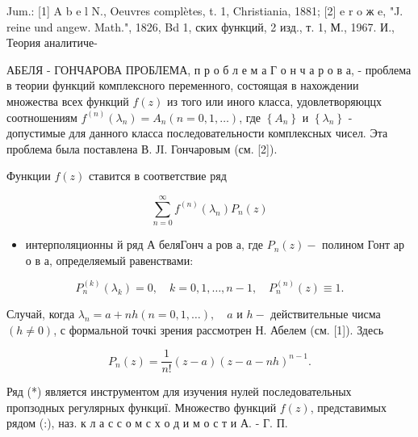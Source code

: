 \documentclass[10pt]{article}
\begin{document}
Jum.: [1] A b e l N., Oeuvres complètes, t. 1, Christiania, 1881; [2] e r o ж e, "J. reine und angew. Math.", 1826, Bd 1, ских функций, 2 изд., т. 1, М., 1967. И., Теория аналитиче-



АБЕЛЯ - ГОНЧАРОВА ПРОБЛЕМА, п р о б л е м а Г о н ч а р о в а, - проблема в теории функций комплексного переменного, состоящая в нахождении множества всех функций $f(z)$ из того или иного класса, удовлетворяюццх соотношениям $f^{(n)}\left(\lambda_{n}\right)=A_{n}(n=0,1, \ldots)$, где $\left\{A_{n}\right\}$ и $\left\{\lambda_{n}\right\}$ - допустимые для данного класса последовательности комплексных чисел. Эта проблема была поставлена В. ЈI. Гончаровым (см. [2]).



Функции $f(z)$ ставится в соответствие ряд



\[

\sum_{n=0}^{\infty} f^{(n)}\left(\lambda_{n}\right) P_{n}(z)

\]



\begin{itemize}

  \item интерполяционны й ряд А беляГонч а ров а, где $P_{n}(z)-$ полином Гонт ар о в а, определяемый равенствами:

\end{itemize}



\[

P_{n}^{(k)}\left(\lambda_{k}\right)=0, \quad k=0,1, \ldots, n-1, \quad P_{n}^{(n)}(z) \equiv 1 .

\]



Случай, когда $\lambda_{n}=a+n h(n=0,1, \ldots), \quad a$ и $h-$ действительные чисма $(h \neq 0)$, с формальной точкі зрения рассмотрен Н. Абелем (см. [1]). Здесь



\[

P_{n}(z)=\frac{1}{n !}(z-a)(z-a-n h)^{n-1} .

\]



Ряд (*) является инструментом для изучения нулей последовательных пропзодных регулярных функциї. Множество функций $f(z)$, представимых рядом (:), наз. к л а с с о м с х о д и м о с т и А. - Г. П.
\end{document}
